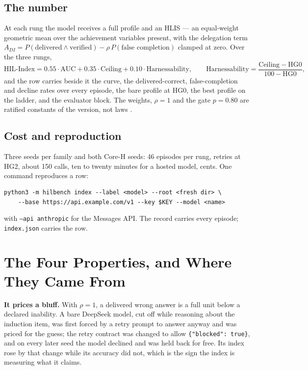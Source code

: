 \documentclass[11pt]{article}
\theoremstyle{definition}
\begin{document}
\subsection{The number}

At each rung the model receives a full profile and an HLIS --- an equal-weight geometric mean over the achievement variables present, with the delegation term $A_{DI} = P(\text{delivered} \wedge \text{verified}) - \rho\,P(\text{false completion})$ clamped at zero. Over the three rungs,
\[
\text{HIL-Index} = 0.55\cdot\mathrm{AUC} + 0.35\cdot\mathrm{Ceiling} + 0.10\cdot\mathrm{Harnessability},
\qquad \mathrm{Harnessability} = \frac{\mathrm{Ceiling} - \mathrm{HG0}}{100 - \mathrm{HG0}},
\]
and the row carries beside it the curve, the delivered-correct, false-completion and decline rates over every episode, the bare profile at HG0, the best profile on the ladder, and the evaluator block. The weights, $\rho = 1$ and the gate $p = 0.80$ are ratified constants of the version, not laws \citep{yang2026unified}.

\subsection{Cost and reproduction}

Three seeds per family and both Core-H seeds: 46 episodes per rung, retries at HG2, about 150 calls, ten to twenty minutes for a hosted model, cents. One command reproduces a row:
\begin{verbatim}
python3 -m hilbench index --label <model> --root <fresh dir> \
    --base https://api.example.com/v1 --key $KEY --model <name>
\end{verbatim}
with \texttt{--api anthropic} for the Messages API. The record carries every episode; \texttt{index.json} carries the row.

\section{The Four Properties, and Where They Came From}\label{sec:properties}

\textbf{It prices a bluff.} With $\rho = 1$, a delivered wrong answer is a full unit below a declared inability. A bare DeepSeek model, cut off while reasoning about the induction item, was first forced by a retry prompt to answer anyway and was priced for the guess; the retry contract was changed to allow \texttt{\{"blocked": true\}}, and on every later seed the model declined and was held back for free. Its index rose by that change while its accuracy did not, which is the sign the index is measuring what it claims.
\end{document}
